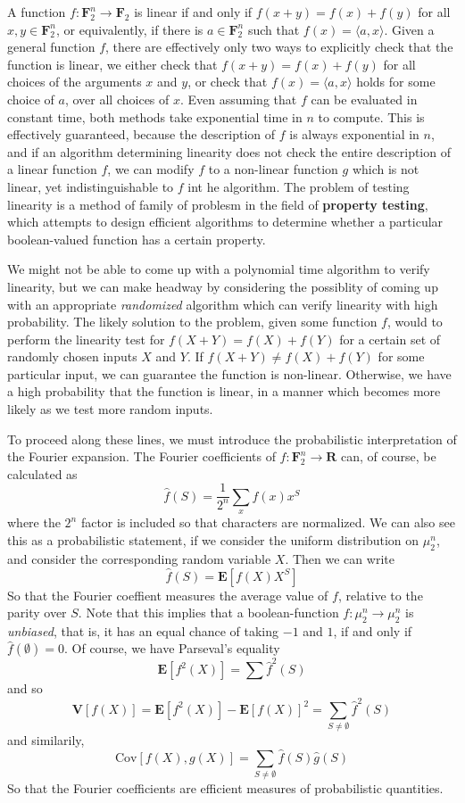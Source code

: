 A function $f: \mathbf{F}_2^n \to \mathbf{F}_2$ is linear if and only if $f(x + y) = f(x) + f(y)$ for all $x,y \in \mathbf{F}_2^n$, or equivalently, if there is $a \in \mathbf{F}_2^n$ such that $f(x) = \langle a, x \rangle$. Given a general function $f$, there are effectively only two ways to explicitly check that the function is linear, we either check that $f(x + y) = f(x) + f(y)$ for all choices of the arguments $x$ and $y$, or check that $f(x) = \langle a, x \rangle$ holds for some choice of $a$, over all choices of $x$. Even assuming that $f$ can be evaluated in constant time, both methods take exponential time in $n$ to compute. This is effectively guaranteed, because the description of $f$ is always exponential in $n$, and if an algorithm determining linearity does not check the entire description of a linear function $f$, we can modify $f$ to a non-linear function $g$ which is not linear, yet indistinguishable to $f$ int he algorithm. The problem of testing linearity is a method of family of problesm in the field of {\bf property testing}, which attempts to design efficient algorithms to determine whether a particular boolean-valued function has a certain property.

We might not be able to come up with a polynomial time algorithm to verify linearity, but we can make headway by considering the possiblity of coming up with an appropriate {\it randomized} algorithm which can verify linearity with high probability. The likely solution to the problem, given some function $f$, would to perform the linearity test for $f(X + Y) = f(X) + f(Y)$ for a certain set of randomly chosen inputs $X$ and $Y$. If $f(X + Y) \neq f(X) + f(Y)$ for some particular input, we can guarantee the function is non-linear. Otherwise, we have a high probability that the function is linear, in a manner which becomes more likely as we test more random inputs.

To proceed along these lines, we must introduce the probabilistic interpretation of the Fourier expansion. The Fourier coefficients of $f: \mathbf{F}_2^n \to \mathbf{R}$ can, of course, be calculated as
%
\[ \widehat{f}(S) = \frac{1}{2^n} \sum_x f(x) x^S \]
%
where the $2^n$ factor is included so that characters are normalized. We can also see this as a probabilistic statement, if we consider the uniform distribution on $\mu_2^n$, and consider the corresponding random variable $X$. Then we can write
%
\[ \widehat{f}(S) = \mathbf{E}[f(X) X^S] \]
%
So that the Fourier coeffient measures the average value of $f$, relative to the parity over $S$. Note that this implies that a boolean-function $f: \mu_2^n \to \mu_2^n$ is {\it unbiased}, that is, it has an equal chance of taking $-1$ and $1$, if and only if $\widehat{f}(\emptyset) = 0$. Of course, we have Parseval's equality
%
\[ \mathbf{E}[f^2(X)] = \sum \widehat{f}^2(S) \]
%
and so
%
\[ \mathbf{V}[f(X)] = \mathbf{E}[f^2(X)] - \mathbf{E}[f(X)]^2 = \sum_{S \neq \emptyset} \widehat{f}^2(S) \]
%
and similarily,
%
\[ \text{Cov}[f(X),g(X)] = \sum_{S \neq \emptyset} \widehat{f}(S) \widehat{g}(S) \]
%
So that the Fourier coefficients are efficient measures of probabilistic quantities.

